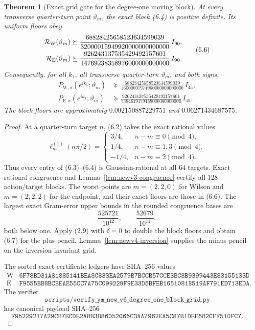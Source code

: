 \documentclass[11pt,oneside]{article}
\newtheorem{theorem}{Theorem}[section]
\theoremstyle{definition}
\theoremstyle{remark}
\begin{document}
\begin{theorem}[Exact grid gate for the degree-one moving block]
\label{thm:newv6-grid}
At every transverse quarter-turn point
\(\vartheta_m\), the exact block (6.4) is positive definite.  Its
uniform floors obey
\[
\begin{aligned}
 {\cal R}_{\mathrm W}(\vartheta_m)
 &\succeq
 \frac{68828425658523634599039}
 {32000015949920000000000000}\,I_{90},\\
 {\cal R}_{\mathrm E}(\vartheta_m)
 &\succeq
 \frac{926243137535429492157601}
 {14769238358976000000000000}\,I_{90}.
\end{aligned}
\tag{6.6}
\]
Consequently, for all \(k_1\), all transverse quarter-turn
\(\vartheta_m\), and both signs,
\[
\begin{aligned}
 P_{\mathrm W,\sigma}(e^{ik_1};\vartheta_m)
 &\succeq
 \frac{68828425658523634599039}
 {16000007974960000000000000}\,I_{45},\\
 P_{\mathrm E,\sigma}(e^{ik_1};\vartheta_m)
 &\succeq
 \frac{926243137535429492157601}
 {7384619179488000000000000}\,I_{45}.
\end{aligned}
\tag{6.7}
\]
The block floors are approximately \(0.002150887229751\) and
\(0.06271434687575\).
\end{theorem}

\begin{proof}
At a quarter-turn target \(n\), (6.2) takes the exact rational
values
\[
 \ell_m^{(1)}(n\pi/2)=
 \begin{cases}
 3/4,&n-m\equiv0\pmod4,\\
 1/4,&n-m\equiv1,3\pmod4,\\
 -1/4,&n-m\equiv2\pmod4.
 \end{cases}                                              \tag{6.8}
\]
Thus every entry of (6.3)--(6.4) is Gaussian-rational at all
\(64\) targets.  Exact rational congruence and
Lemma~\ref{lem:newv3-congruence} certify all \(128\) action/target
blocks.  The worst points are \(m=(2,2,0)\) for Wilson and
\(m=(2,2,2)\) for the endpoint, and their exact floors are those in
(6.6).  The largest exact Gram-error upper bounds in the rounded
congruence bases are
\[
 \frac{525721}{10^{12}},\qquad
 \frac{52679}{10^{11}},                                   \tag{6.9}
\]
both below one.  Apply (2.9) with \(\delta=0\) to double the block
floors and obtain (6.7) for the plus pencil.
Lemma~\ref{lem:newv4-inversion} supplies the minus pencil on the
inversion-invariant grid.

The sorted exact certificate ledgers have SHA--256 values
\[
\begin{array}{c|c}
\mathrm W&
\texttt{6F78BD31A81885141BEA8C833EA2579B7BCCB57CCE3BC8B9399443E83155133D}\\
\mathrm E&
\texttt{F9555BB8BCBEAE55CC7A75C099229F9E33D5BFEB1651081B519AF791ED713EDA}.
\end{array}                                               \tag{6.10}
\]
The verifier
\[
\texttt{scripts/verify\_ym\_new\_v6\_degree\_one\_block\_grid.py}
\]
has canonical payload SHA--256
\[
\texttt{F95229217A29CB7ECDE2A8B3B86052066C3AA7962EA5C87B1DEE682CFF510FC7}.
                                                               \tag{6.11}
\]
\end{proof}
\end{document}
